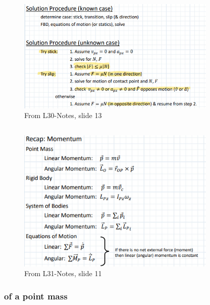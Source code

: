     \begin{figure}[h!]
    \centering \includegraphics[width=0.85\textwidth]{WorkEnergyFigs/FrictionSolutionProcedure.png}
    \caption{From L30-Notes, slide 13}
    \label{fig:FrictionSolutionProcedure}
    \end{figure}

\subsection{}
    \begin{figure}[h!]
    \centering \includegraphics[width=0.85\textwidth]{WorkEnergyFigs/Momentum.png}
    \caption{From L31-Notes, slide 11}
    \label{fig:Momentum}
    \end{figure}
    
    \subsubsection{of a point mass}
    
